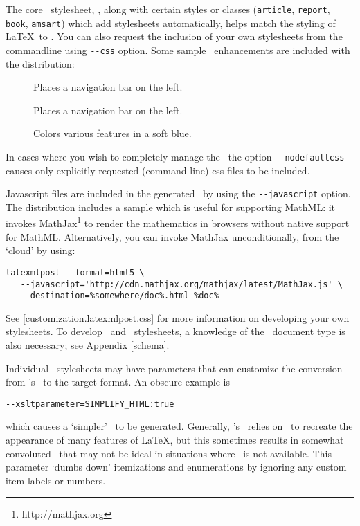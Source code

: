 \documentclass{book}
\newcommand{\shellcode}{\lstinline[style=shell]}
\begin{document}
The core \CSS\ stylesheet, , along with
certain styles or classes (\texttt{article}, \texttt{report}, \texttt{book},
\texttt{amsart}) which add stylesheets automatically,
helps match the styling of \LaTeX\ to \HTML.
You can also request the inclusion of your own stylesheets from the commandline using
\shellcode{--css} option.  Some sample \CSS\ enhancements are included with the distribution:
\begin{description}
\item[] Places a navigation bar on the left.
\item[] Places a navigation bar on the left.
\item[] Colors various features in a soft blue.
\end{description}
In cases where you wish to completely manage the \CSS\,
the option \shellcode{--nodefaultcss} causes only explicitly requested (command-line)
css files to be included.

Javascript files are included in the generated \HTML\ by using the \shellcode{--javascript} option.
The distribution includes a sample  which is useful
for supporting MathML: it invokes MathJax\footnote{http://mathjax.org}
to render the mathematics in browsers without native support for MathML.
Alternatively, you can invoke MathJax unconditionally, from the `cloud' by using:
\begin{lstlisting}[style=shell]
latexmlpost --format=html5 \
   --javascript='http://cdn.mathjax.org/mathjax/latest/MathJax.js' \
   --destination=%somewhere/doc%.html %doc%
\end{lstlisting}

See \ref{customization.latexmlpost.css} for more information on developing your own stylesheets.
To develop \CSS\ and \XSLT\ stylesheets, 
a knowledge of the \LaTeXML\ document type is also necessary; see  Appendix \ref{schema}.

Individual \XSLT\ stylesheets may have parameters that can customize the
conversion from \LaTeXML's \XML\ to the target format.  An obscure example is
\begin{lstlisting}[style=shell]
--xsltparameter=SIMPLIFY_HTML:true
\end{lstlisting}
which causes a `simpler' \HTML\ to be generated.
Generally, \LaTeXML's \HTML\ relies on \CSS\ to recreate the appearance
of many features of \LaTeX, but this sometimes results in somewhat convoluted
\HTML\ that may not be ideal in situations where \CSS\ is not available.
This parameter `dumbs down' itemizations and enumerations by
ignoring any custom item labels or numbers.
\end{document}
